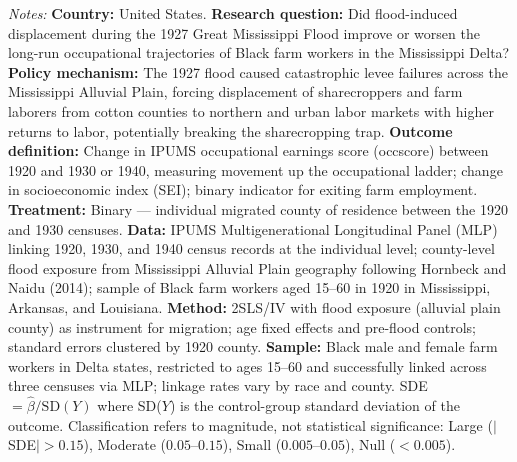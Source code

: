 \begin{table}[t]
{\textit{Notes:} \textbf{Country:} United States. \textbf{Research question:} Did flood-induced displacement during the 1927 Great Mississippi Flood improve or worsen the long-run occupational trajectories of Black farm workers in the Mississippi Delta? \textbf{Policy mechanism:} The 1927 flood caused catastrophic levee failures across the Mississippi Alluvial Plain, forcing displacement of sharecroppers and farm laborers from cotton counties to northern and urban labor markets with higher returns to labor, potentially breaking the sharecropping trap. \textbf{Outcome definition:} Change in IPUMS occupational earnings score (occscore) between 1920 and 1930 or 1940, measuring movement up the occupational ladder; change in socioeconomic index (SEI); binary indicator for exiting farm employment. \textbf{Treatment:} Binary --- individual migrated county of residence between the 1920 and 1930 censuses. \textbf{Data:} IPUMS Multigenerational Longitudinal Panel (MLP) linking 1920, 1930, and 1940 census records at the individual level; county-level flood exposure from Mississippi Alluvial Plain geography following Hornbeck and Naidu (2014); sample of Black farm workers aged 15--60 in 1920 in Mississippi, Arkansas, and Louisiana. \textbf{Method:} 2SLS/IV with flood exposure (alluvial plain county) as instrument for migration; age fixed effects and pre-flood controls; standard errors clustered by 1920 county. \textbf{Sample:} Black male and female farm workers in Delta states, restricted to ages 15--60 and successfully linked across three censuses via MLP; linkage rates vary by race and county. SDE $= \hat{\beta} / \text{SD}(Y)$ where SD($Y$) is the control-group standard deviation of the outcome. Classification refers to magnitude, not statistical significance: Large ($|$SDE$| > 0.15$), Moderate ($0.05$--$0.15$), Small ($0.005$--$0.05$), Null ($< 0.005$).
}
\end{table}
